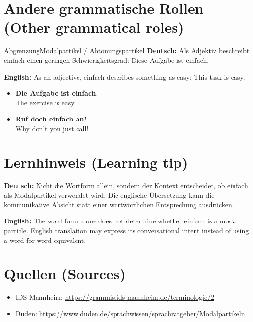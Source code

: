 \documentclass[a4paper,11pt]{article}
\newcommand{\GermanText}[1]{\textbf{Deutsch: }#1\par}
\newcommand{\EnglishText}[1]{{\small\color{SoftGray}\textbf{English: }#1\par}}
\newcommand{\ExampleItem}[2]{\item \textbf{#1}\\{\small\color{SoftGray}#2}}
\begin{document}
\section{Andere grammatische Rollen \textnormal{(Other grammatical roles)}}
\begin{grammarentry}{Abgrenzung}{Modalpartikel / Abtönungspartikel}
\GermanText{Als Adjektiv beschreibt einfach einen geringen Schwierigkeitsgrad: Diese Aufgabe ist einfach.}
\EnglishText{As an adjective, einfach describes something as easy: This task is easy.}
\end{grammarentry}
\begin{exbox}\begin{itemize}
\ExampleItem{Die Aufgabe ist einfach.}{The exercise is easy.}
\ExampleItem{Ruf doch einfach an!}{Why don't you just call!}
\end{itemize}\end{exbox}
\section{Lernhinweis \textnormal{(Learning tip)}}
\GermanText{Nicht die Wortform allein, sondern der Kontext entscheidet, ob einfach als Modalpartikel verwendet wird. Die englische Übersetzung kann die kommunikative Absicht statt einer wortwörtlichen Entsprechung ausdrücken.}
\EnglishText{The word form alone does not determine whether einfach is a modal particle. English translation may express its conversational intent instead of using a word-for-word equivalent.}
\section{Quellen \textnormal{(Sources)}}
\begin{itemize}
\item IDS Mannheim: \url{https://grammis.ids-mannheim.de/terminologie/2}
\item Duden: \url{https://www.duden.de/sprachwissen/sprachratgeber/Modalpartikeln}
\end{itemize}
\end{document}
